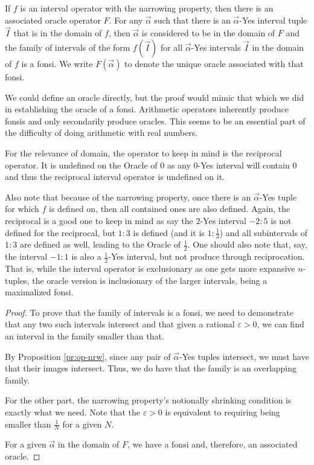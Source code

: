 \documentclass[12pt]{article}
\begin{document}
\begin{theorem}\label{th:intop}
If $f$ is an interval operator with the narrowing property, then there is an associated oracle operator $F$. For any $\vec{\alpha}$ such that there is an $\vec{\alpha}$-Yes interval tuple $\vec{I}$ that is in the domain of 
$f$, then $\vec{\alpha}$ is considered to be in the domain of $F$ and the family of intervals of the form $f(\vec{I})$ for all $\vec{\alpha}$-Yes intervals $\vec{I}$ in the domain of $f$ is a fonsi. We write $F(\vec{\alpha})$ to denote the unique oracle associated with that fonsi. 
\end{theorem}

We could define an oracle directly, but the proof would mimic that which we did in establishing the oracle of a fonsi. Arithmetic operators inherently produce fonsis and only secondarily produce oracles. This seems to be an essential part of the difficulty of doing arithmetic with real numbers. 

For the relevance of domain, the operator to keep in mind is the reciprocal operator. It is undefined on the Oracle of 0 as any 0-Yes interval will contain 0 and thus the reciprocal interval operator is undefined on it. 

Also note that because of the narrowing property, once there is an $\vec{\alpha}$-Yes tuple for which $f$ is defined on, then all contained ones are also defined. Again, the reciprocal is a good one to keep in mind as say the $2$-Yes interval $-2:5$ is not defined for the reciprocal, but $1:3$ is defined (and it is $1:\frac{1}{3}$) and all subintervals of $1:3$ are defined as well, leading to the Oracle of $\frac{1}{2}$. One should also note that, say, the interval $-1:1$ is also a $\frac{1}{2}$-Yes interval, but not produce through reciprocation. That is, while the interval operator is exclusionary as one gets more expansive $n$-tuples, the oracle version is inclusionary of the larger intervals, being a maximalized fonsi. 

\begin{proof}
To prove that the family of intervals is a fonsi, we need to demonstrate that any two such intervals intersect and that given a rational $\varepsilon > 0$, we can find an interval in the family smaller than that. 

By Proposition \ref{pr:op-nrw}, since any pair of $\vec{\alpha}$-Yes tuples intersect, we must have that their images intersect. Thus, we do have that the family is an overlapping family. 

For the other part, the narrowing property's notionally shrinking condition is exactly what we need. Note that the $\varepsilon > 0$ is equivalent to requiring being smaller than $\frac{1}{N}$ for a given $N$.

For a given $\vec{\alpha}$ in the domain of $F$, we have a fonsi and, therefore, an associated oracle.
\end{proof}
\end{document}
